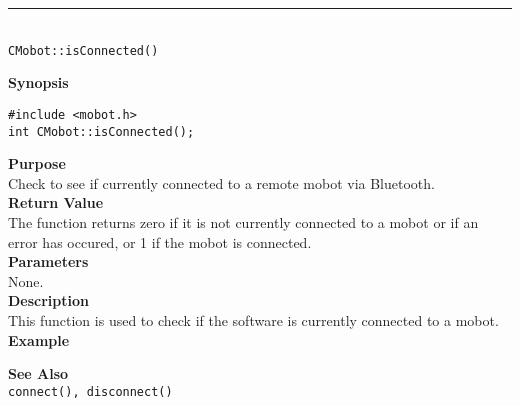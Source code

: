 \noindent
\vspace{5pt}
\rule{4.5in}{0.015in}\\
\noindent
{\LARGE \texttt{CMobot::isConnected()}}\\
{}

\noindent
{\bf Synopsis}
\vspace{-8pt}
\begin{verbatim}
#include <mobot.h>
int CMobot::isConnected();
\end{verbatim}

\noindent
{\bf Purpose}\\
Check to see if currently connected to a remote mobot via Bluetooth.\\

\noindent
{\bf Return Value}\\
The function returns zero if it is not currently connected to a mobot or if an 
error has occured, or 1 if the mobot is connected.\\

\noindent
{\bf Parameters}\\
None.\\

\noindent
{\bf Description}\\
This function is used to check if the software is currently connected to
a mobot.\\

\noindent
{\bf Example}\\
\noindent

\noindent
{\bf See Also}\\
\texttt{connect(), disconnect()}\\
